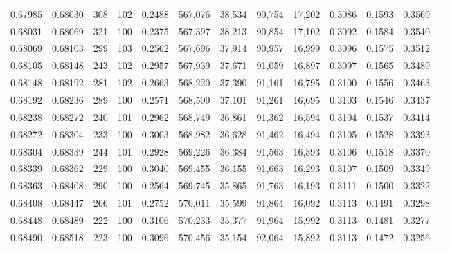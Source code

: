 \begin{tabular}{rrrrrrrrrrrrr}
0.67985 & 0.68030 &   308 & 102 &                                     0.2488 & 567,076 &  38,534 &  90,754 &  17,202 & 0.3086 & 0.1593 & 0.3569 \\
0.68031 & 0.68069 &   321 & 100 &                                     0.2375 & 567,397 &  38,213 &  90,854 &  17,102 & 0.3092 & 0.1584 & 0.3540 \\
0.68069 & 0.68103 &   299 & 103 &                                     0.2562 & 567,696 &  37,914 &  90,957 &  16,999 & 0.3096 & 0.1575 & 0.3512 \\
0.68105 & 0.68148 &   243 & 102 &                                     0.2957 & 567,939 &  37,671 &  91,059 &  16,897 & 0.3097 & 0.1565 & 0.3489 \\
0.68148 & 0.68192 &   281 & 102 &                                     0.2663 & 568,220 &  37,390 &  91,161 &  16,795 & 0.3100 & 0.1556 & 0.3463 \\
0.68192 & 0.68236 &   289 & 100 &                                     0.2571 & 568,509 &  37,101 &  91,261 &  16,695 & 0.3103 & 0.1546 & 0.3437 \\
0.68238 & 0.68272 &   240 & 101 &                                     0.2962 & 568,749 &  36,861 &  91,362 &  16,594 & 0.3104 & 0.1537 & 0.3414 \\
0.68272 & 0.68304 &   233 & 100 &                                     0.3003 & 568,982 &  36,628 &  91,462 &  16,494 & 0.3105 & 0.1528 & 0.3393 \\
0.68304 & 0.68339 &   244 & 101 &                                     0.2928 & 569,226 &  36,384 &  91,563 &  16,393 & 0.3106 & 0.1518 & 0.3370 \\
0.68339 & 0.68362 &   229 & 100 &                                     0.3040 & 569,455 &  36,155 &  91,663 &  16,293 & 0.3107 & 0.1509 & 0.3349 \\
0.68363 & 0.68408 &   290 & 100 &                                     0.2564 & 569,745 &  35,865 &  91,763 &  16,193 & 0.3111 & 0.1500 & 0.3322 \\
0.68408 & 0.68447 &   266 & 101 &                                     0.2752 & 570,011 &  35,599 &  91,864 &  16,092 & 0.3113 & 0.1491 & 0.3298 \\
0.68448 & 0.68489 &   222 & 100 &                                     0.3106 & 570,233 &  35,377 &  91,964 &  15,992 & 0.3113 & 0.1481 & 0.3277 \\
0.68490 & 0.68518 &   223 & 100 &                                     0.3096 & 570,456 &  35,154 &  92,064 &  15,892 & 0.3113 & 0.1472 & 0.3256 \\

\end{tabular}
